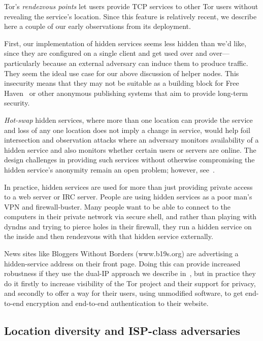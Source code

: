 \documentclass{llncs}
\begin{document}
Tor's \emph{rendezvous points}
let users provide TCP services to other Tor users without revealing
the service's location. Since this feature is relatively recent, we describe here
a couple of our early observations from its deployment.

First, our implementation of hidden services seems less hidden than we'd
like, since they are configured on a single client and get used over
and over---particularly because an external adversary can induce them to
produce traffic. They seem the ideal use case for our above discussion
of helper nodes. This insecurity means that they may not be suitable as
a building block for Free Haven~\cite{freehaven-berk} or other anonymous
publishing systems that aim to provide long-term security.

\emph{Hot-swap} hidden services, where more than one location can
provide the service and loss of any one location does not imply a
change in service, would help foil intersection and observation attacks
where an adversary monitors availability of a hidden service and also
monitors whether certain users or servers are online. The design
challenges in providing such services without otherwise compromising
the hidden service's anonymity remain an open problem;
however, see~\cite{move-ndss05}.

In practice, hidden services are used for more than just providing private
access to a web server or IRC server. People are using hidden services
as a poor man's VPN and firewall-buster. Many people want to be able
to connect to the computers in their private network via secure shell,
and rather than playing with dyndns and trying to pierce holes in their
firewall, they run a hidden service on the inside and then rendezvous
with that hidden service externally.

News sites like Bloggers Without Borders (www.b19s.org) are advertising
a hidden-service address on their front page. Doing this can provide
increased robustness if they use the dual-IP approach we describe
in~\cite{tor-design},
but in practice they do it firstly to increase visibility
of the Tor project and their support for privacy, and secondly to offer
a way for their users, using unmodified software, to get end-to-end
encryption and end-to-end authentication to their website.

\subsection{Location diversity and ISP-class adversaries}
\label{subsec:routing-zones}
\end{document}

